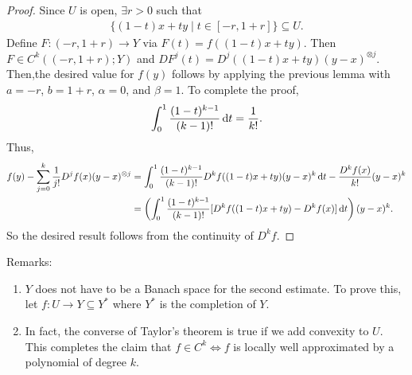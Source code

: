 \documentclass{report}
\begin{document}
\begin{proof}
    Since $U$ is open, $\exists r > 0$ such that 
    \begin{align*}
        \{(1-t)x + ty \mid t \in [-r, 1+r] \} \subseteq U.
    \end{align*}
    Define $F: (-r, 1+r) \to Y$ via $F(t) = f((1-t)x + ty)$. Then $F \in C^k((-r, 1+r) ; Y)$ and $DF^j(t) = D^j((1-t)x + ty) (y-x)^{\otimes j}$. Then,the desired value for $f(y)$ follows by applying the previous lemma with $a = -r$, $b = 1+r$, $\alpha = 0$, and $\beta = 1$. To complete the proof, 
    \begin{align*}
        \int_0^1 \frac{(1-t)^{k-1}}{(k-1)!} \, \text dt = \frac{1}{k!}.
    \end{align*}
    Thus, 
    \begin{align*}
        f(y) - \sum_{j=0}^{k} \frac{1}{j!} D^jf(x) (y-x)^{\otimes j} &= \int_0^1 \frac{(1-t)^{k-1}}{(k-1)!} D^{k} f((1-t)x + ty) (y-x)^{k} \, \text dt  - \frac{D^kf(x)}{k!}(y-x)^k\\
        &= \left(\int_0^1 \frac{(1-t)^{k-1}}{(k-1)!} [D^{k} f((1-t)x + ty) - D^kf(x)]  \, \text dt \right)(y-x)^{k}.
    \end{align*}
    So the desired result follows from the continuity of $D^kf$.
\end{proof}
\noindent Remarks:
\begin{enumerate}
    \item $Y$ does not have to be a Banach space for the second estimate. To prove this, let $f: U \to Y \subseteq Y^*$ where $Y^*$ is the completion of $Y$.
    \item In fact, the converse of Taylor's theorem is true if we add convexity to $U$. This completes the claim that $f \in C^k \iff f$ is locally well approximated by a polynomial of degree $k$.
\end{enumerate}
\newpage
\end{document}
